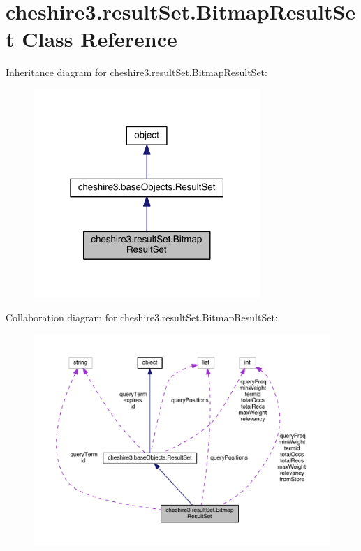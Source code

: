 \hypertarget{classcheshire3_1_1result_set_1_1_bitmap_result_set}{\section{cheshire3.\-result\-Set.\-Bitmap\-Result\-Set Class Reference}
\label{classcheshire3_1_1result_set_1_1_bitmap_result_set}
}


Inheritance diagram for cheshire3.\-result\-Set.\-Bitmap\-Result\-Set\-:
\nopagebreak
\begin{figure}[H]
\begin{center}
\leavevmode
\includegraphics[width=244pt]{classcheshire3_1_1result_set_1_1_bitmap_result_set__inherit__graph}
\end{center}
\end{figure}


Collaboration diagram for cheshire3.\-result\-Set.\-Bitmap\-Result\-Set\-:
\nopagebreak
\begin{figure}[H]
\begin{center}
\leavevmode
\includegraphics[width=350pt]{classcheshire3_1_1result_set_1_1_bitmap_result_set__coll__graph}
\end{center}
\end{figure}
